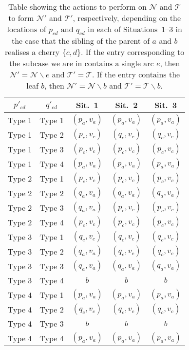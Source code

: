 \documentclass[11pt]{amsart}
\begin{document}
\begin{table}[H]
\caption{Table showing the actions to perform on ${{\mathcal N}}$ and ${{\mathcal T}}$ to form ${{\mathcal N}}'$ and ${{\mathcal T}}'$, respectively, depending on the locations of $p_{cd}$ and $q_{cd}$ in each of Situations~1--3 in the case that the sibling of the parent of $a$ and $b$ realises a cherry $\{c, d\}$. If the entry corresponding to the subcase we are in contains a single arc $e$, then ${{\mathcal N}}'={{\mathcal N}}\backslash e$ and ${{\mathcal T}}'={{\mathcal T}}$. If the entry contains the leaf $b$, then ${{\mathcal N}}'={{\mathcal N}}\backslash b$ and ${{\mathcal T}}'={{\mathcal T}}\backslash b$.}
\begin{center}
\begin{tabular}{|c|c|c|c|c|} \hline
$p'_{cd}$ & $q'_{cd}$ & Sit.\ 1 & Sit.\ 2 & Sit.\ 3 \\
\hline
Type 1 & Type 1 & $(p_a, v_a)$ & $(p_a, v_a)$ & $(p_a, v_a)$ \\
Type 1 & Type 2 & $(p_c, v_c)$ & $(q_c, v_c)$ & $(q_c, v_c)$ \\
Type 1 &  Type 3 & $(p_c, v_c)$ & $(p_c, v_c)$ & $(p_c, v_c)$ \\
Type 1 &  Type 4 & $(p_a, v_a)$ & $(p_a, v_a)$ & $(p_a, v_a)$ \\
 Type 2 & Type 1 & $(p_c, v_c)$ & $(p_c, v_c)$ & $(p_c, v_c)$ \\
 Type 2 &  Type 2 & $(q_a, v_a)$ & $(q_a, v_a)$ & $(q_a, v_a)$ \\
 Type 2 &  Type 3 & $(q_a, v_a)$ & $(p_c, v_c)$ & $(p_c, v_c)$ \\
 Type 2 &  Type 4 & $(p_c, v_c)$ & $(p_c, v_c)$ & $(p_c, v_c)$ \\
 Type 3 &  Type 1 & $(q_c, v_c)$ & $(q_c, v_c)$ & $(q_c, v_c)$ \\
 Type 3 &  Type 2 & $(q_a, v_a)$ & $(q_c, v_c)$ & $(q_c, v_c)$ \\
 Type 3 &  Type 3 & $(q_a, v_a)$ & $(q_a, v_a)$ & $(q_a, v_a)$ \\
 Type 3 & Type 4 & $b$ & $b$ & $b$ \\
 Type 4 &  Type 1 & $(p_a, v_a)$ & $(p_a, v_a)$ & $(p_a, v_a)$ \\
 Type 4&  Type 2 & $(q_c, v_c)$ & $(q_c, v_c)$ & $(q_c, v_c)$ \\
 Type 4 &  Type 3 & $b$ & $b$ & $b$ \\
 Type 4 &  Type 4 & $(p_a, v_a)$ & $(p_a, v_a)$ & $(p_a, v_a)$ \\ \hline
\end{tabular}
\end{center}
\label{cherryctable}
\end{table}
\end{document}
